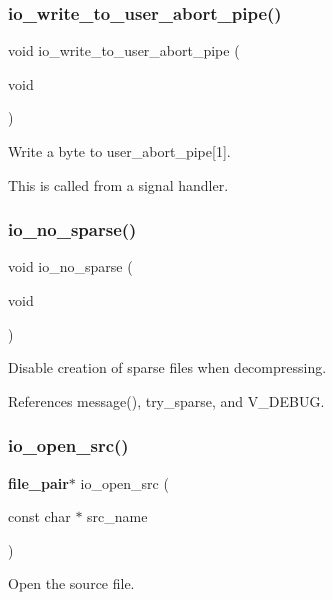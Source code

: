 \subsubsection{io\+\_\+write\+\_\+to\+\_\+user\+\_\+abort\+\_\+pipe()}
{\footnotesize\ttfamily void io\+\_\+write\+\_\+to\+\_\+user\+\_\+abort\+\_\+pipe (\begin{DoxyParamCaption}\item[{void}]{ }\end{DoxyParamCaption})}



Write a byte to user\+\_\+abort\+\_\+pipe[1]. 

This is called from a signal handler. \mbox{\label{file__io_8h_a26350b70a7ef7ae45e57f04157ade2aa}} 
\subsubsection{io\+\_\+no\+\_\+sparse()}
{\footnotesize\ttfamily void io\+\_\+no\+\_\+sparse (\begin{DoxyParamCaption}\item[{void}]{ }\end{DoxyParamCaption})}



Disable creation of sparse files when decompressing. 



References message(), try\+\_\+sparse, and V\+\_\+\+D\+E\+B\+UG.

\mbox{\label{file__io_8h_ac4fb03f340ee03676cbde913682a3719}} 
\subsubsection{io\+\_\+open\+\_\+src()}
{\footnotesize\ttfamily \textbf{ file\+\_\+pair}$\ast$ io\+\_\+open\+\_\+src (\begin{DoxyParamCaption}\item[{const char $\ast$}]{src\+\_\+name }\end{DoxyParamCaption})}



Open the source file. 



